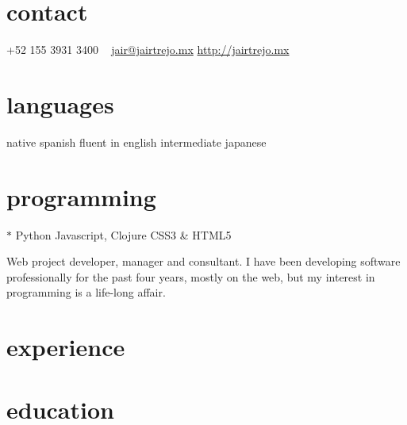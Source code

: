 \documentclass[]{friggeri-cv} %
\begin{document}


\begin{aside} %
\section{contact}
+52 155 3931 3400
~
\href{mailto:jair@jairtrejo.mx}{jair@jairtrejo.mx}
\href{http://jairtrejo.mx}{http://jairtrejo.mx}
\section{languages}
native spanish
fluent in english
intermediate japanese
\section{programming}
{\color{red} $\ast$} Python
Javascript, Clojure
CSS3 \& HTML5
\end{aside}

Web project developer, manager and consultant. I have been developing software professionally for the past four years, mostly on the web, but my interest in programming is a life-long affair.


\section{experience}

\begin{entrylist}

\end{entrylist}


\section{education}
\end{document}
